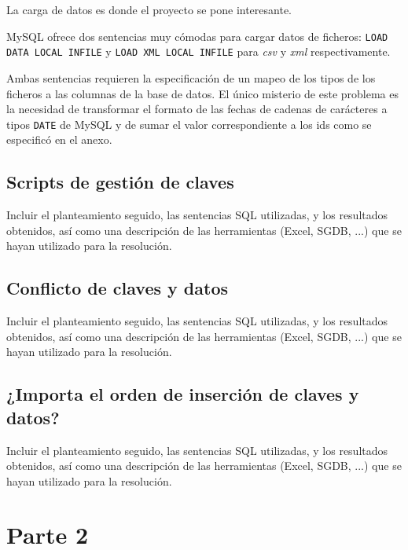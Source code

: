 \documentclass[a4paper, 11pt, oneside]{article} %
\begin{document}
La carga de datos es donde el proyecto se pone interesante.

MySQL ofrece dos sentencias muy cómodas para cargar datos de ficheros: \texttt{LOAD DATA LOCAL INFILE} y \texttt{LOAD XML LOCAL INFILE} para \emph{csv} y \emph{xml} respectivamente.

Ambas sentencias requieren la especificación de un mapeo de los tipos de los ficheros a las columnas de la base de datos. El único misterio de este problema es la necesidad de transformar el formato de las fechas de cadenas de carácteres a tipos \texttt{DATE} de MySQL y de sumar el valor correspondiente a los ids como se especificó en el anexo.

\subsection{Scripts de gestión de claves}

Incluir el planteamiento seguido, las sentencias SQL utilizadas, y los resultados obtenidos, así como una descripción de las herramientas (Excel, SGDB, ...) que se hayan utilizado para la resolución.

\subsection{Conflicto de claves y datos}

Incluir el planteamiento seguido, las sentencias SQL utilizadas, y los resultados obtenidos, así como una descripción de las herramientas (Excel, SGDB, ...) que se hayan utilizado para la resolución.

\subsection{¿Importa el orden de inserción de claves y datos?}

Incluir el planteamiento seguido, las sentencias SQL utilizadas, y los resultados obtenidos, así como una descripción de las herramientas (Excel, SGDB, ...) que se hayan utilizado para la resolución.
	
\newpage


\section{Parte 2}
\end{document}
